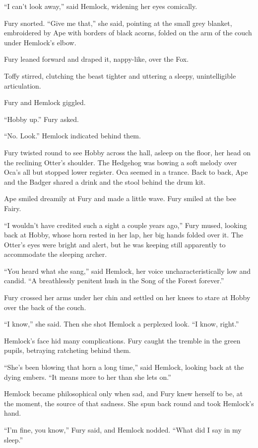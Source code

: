 \documentclass[11pt,a5paper]{article}
\begin{document}
``I can't look away,'' said Hemlock, widening her eyes comically.

Fury snorted. ``Give me that,'' she said, pointing at the small grey blanket, embroidered by Ape with borders of black acorns, folded on the arm of the couch under Hemlock's elbow.

Fury leaned forward and draped it, nappy-like, over the Fox.

Toffy stirred, clutching the beast tighter and uttering a sleepy, unintelligible articulation.

Fury and Hemlock giggled.

``Hobby up.'' Fury asked.

``No. Look.'' Hemlock indicated behind them.

Fury twisted round to see Hobby across the hall, asleep on the floor, her head on the reclining Otter's shoulder. The Hedgehog was bowing a soft melody over Oca's all but stopped lower register. Oca seemed in a trance. Back to back, Ape and the Badger shared a drink and the stool behind the drum kit.

Ape smiled dreamily at Fury and made a little wave. Fury smiled at the bee Fairy.

``I wouldn't have credited such a sight a couple years ago,'' Fury mused, looking back at Hobby, whose horn rested in her lap, her big hands folded over it. The Otter's eyes were bright and alert, but he was keeping still apparently to accommodate the sleeping archer.

``You heard what she sang,'' said Hemlock, her voice uncharacteristically low and candid. ``A breathlessly penitent hush in the Song of the Forest forever.''

Fury crossed her arms under her chin and settled on her knees to stare at Hobby over the back of the couch.

``I know,'' she said. Then she shot Hemlock a perplexed look. ``I know, right.''

Hemlock's face hid many complications. Fury caught the tremble in the green pupils, betraying ratcheting behind them.

``She's been blowing that horn a long time,'' said Hemlock, looking back at the dying embers. ``It means more to her than she lets on.''

Hemlock became philosophical only when sad, and Fury knew herself to be, at the moment, the source of that sadness. She spun back round and took Hemlock's hand.

``I'm fine, you know,'' Fury said, and Hemlock nodded. ``What did I say in my sleep.''
\end{document}
